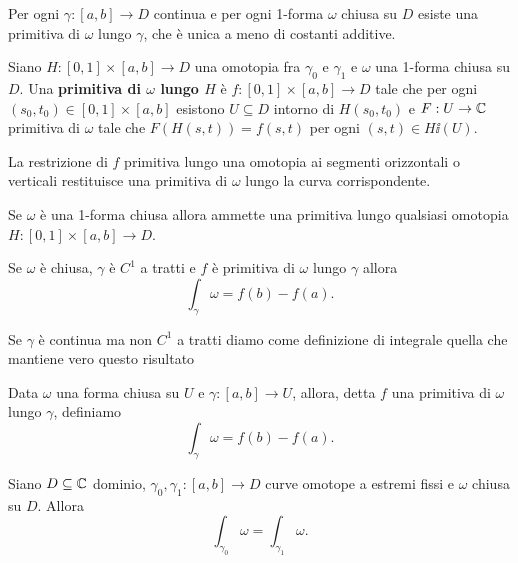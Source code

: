 \begin{multicols*}{2}
\begin{theorem}\label{EsistenzaQuasiUnicitaPrimitiveLungoCurve}
Per ogni $\gamma:[a,b]\to D$ continua e per ogni 1-forma $\omega$ chiusa su $D$ esiste una primitiva di $\omega$ lungo $\gamma$, che \`e unica a meno di costanti additive.
\end{theorem}


\begin{definition}
Siano $H:[0,1]\times[a,b]\to D$ una omotopia fra $\gamma_0$ e $\gamma_1$ e $\omega$ una 1-forma chiusa su $D$. Una \textbf{primitiva di $\omega$ lungo $H$} \`e $f:[0,1]\times[a,b]\to D$ tale che per ogni $(s_0,t_0)\in [0,1]\times[a,b]$ esistono $U\subseteq D$ intorno di $H(s_0,t_0)$ e $F:U\to\mathbb{C}$ primitiva di $\omega$ tale che $F(H(s,t))=f(s,t)$ per ogni $(s,t)\in H\ii(U)$.
\end{definition}
\begin{remark}
La restrizione di $f$ primitiva lungo una omotopia ai segmenti orizzontali o verticali restituisce una primitiva di $\omega$ lungo la curva corrispondente.
\end{remark}

\begin{theorem}\label{EsistenzaEQuasiUnicitaPrimitiveLungoOmotopie}
Se $\omega$ \`e una 1-forma chiusa allora ammette una primitiva lungo qualsiasi omotopia $H:[0,1]\times[a,b]\to D$.
\end{theorem}

\begin{corollary}\label{IntegrazioneFormeChiuseTramitePrimitivaLungoCurve}
Se $\omega$ \`e chiusa, $\gamma$ \`e $C^1$ a tratti e $f$ \`e primitiva di $\omega$ lungo $\gamma$ allora
\[\int_\gamma\omega=f(b)-f(a).\]
\end{corollary}

\noindent Se $\gamma$ \`e continua ma non $C^1$ a tratti diamo come definizione di integrale quella che mantiene vero questo risultato
\begin{definition}
Data $\omega$ una forma chiusa su $U$ e $\gamma:[a,b]\to U$, allora, detta $f$ una primitiva di $\omega$ lungo $\gamma$, definiamo
\[\int_\gamma\omega=f(b)-f(a).\]
\end{definition}


\begin{theorem}\label{InvarianzaIntegraleCamminiOmotopi}
Siano $D\subseteq\mathbb{C}$ dominio, $\gamma_0,\gamma_1:[a,b]\to D$ curve omotope a estremi fissi e $\omega$ chiusa su $D$. Allora
\[\int_{\gamma_0}\omega=\int_{\gamma_1}\omega.\]
\end{theorem}



\end{multicols*}
